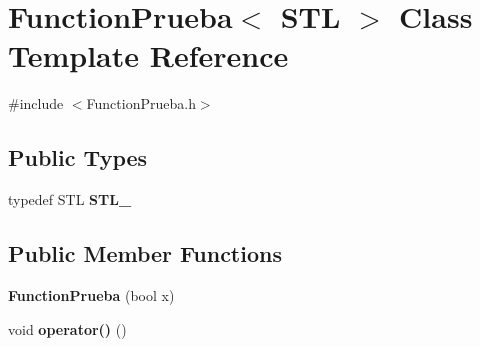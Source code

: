 \hypertarget{class_function_prueba}{\section{Function\-Prueba$<$ S\-T\-L $>$ Class Template Reference}
\label{class_function_prueba}
}


{\ttfamily \#include $<$Function\-Prueba.\-h$>$}

\subsection*{Public Types}
\begin{DoxyCompactItemize}
\item 
\hypertarget{class_function_prueba_a90cb9d1930876499f424b58b1c2f8520}{typedef S\-T\-L {\bfseries S\-T\-L\-\_\-}}\label{class_function_prueba_a90cb9d1930876499f424b58b1c2f8520}

\end{DoxyCompactItemize}
\subsection*{Public Member Functions}
\begin{DoxyCompactItemize}
\item 
\hypertarget{class_function_prueba_a97ef57168bfbbf79b31fdb1ef045eca9}{{\bfseries Function\-Prueba} (bool x)}\label{class_function_prueba_a97ef57168bfbbf79b31fdb1ef045eca9}

\item 
\hypertarget{class_function_prueba_a80c5b2ade210343ff384b05d04c42c0d}{void {\bfseries operator()} ()}\label{class_function_prueba_a80c5b2ade210343ff384b05d04c42c0d}

\end{DoxyCompactItemize}
